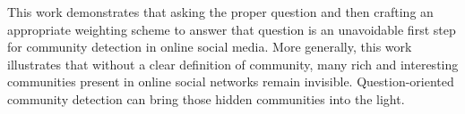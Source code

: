







This work demonstrates that asking the proper question and then crafting an appropriate weighting scheme to answer that question is an unavoidable first step for community detection in online social media. More generally, this work illustrates that without a clear definition of community, many rich and interesting communities present in online social networks remain invisible. Question-oriented community detection can bring those hidden communities into the light.

